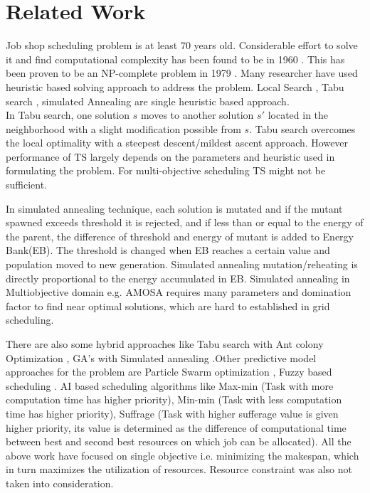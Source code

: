 \chapter{Related Work}
Job shop scheduling problem is at least 70 years old. Considerable effort to solve it and find computational complexity has been found to be in 1960 \cite{manne1960job}. This has been proven to be an NP-complete problem in 1979 \cite{jis1979computers}. Many researcher have used heuristic based solving approach to address the problem. Local Search \cite{ritchie2003fast}, Tabu search \cite{abraham2000nature}, simulated Annealing \cite{yarkhan2002experiments} \cite{abraham2000nature} are single heuristic based approach. \\
In Tabu search, one solution $s$ moves to another solution $s'$ located in the neighborhood with a slight modification possible from $s$. Tabu search overcomes the local optimality with a steepest descent/mildest ascent approach. However performance of TS largely depends on the parameters and heuristic used in formulating the problem. For multi-objective scheduling TS might not be sufficient. 

In simulated annealing technique, each solution is mutated and if the mutant spawned exceeds threshold it is rejected, and if less than or equal to the energy of the parent, the difference of threshold and energy of mutant is added to Energy Bank(EB). The  threshold is changed when EB reaches a certain value and population moved to new generation. Simulated annealing mutation/reheating is directly proportional to the energy accumulated in EB. Simulated annealing in Multiobjective domain e.g. AMOSA \cite{bandyopadhyay2008simulated} requires many parameters and domination factor to find near optimal solutions, which are hard to established in grid scheduling.

There are also some hybrid approaches like Tabu search with Ant colony Optimization \cite{ritchie2003static} \cite{ritchie2004hybrid}, GA's with Simulated annealing \cite{zheng2006task}.Other predictive model approaches for the problem are Particle Swarm optimization \cite{liu2010scheduling}  \cite{abraham2006scheduling}, Fuzzy based scheduling \cite{kumar2004fuzzy}. AI based scheduling algorithms like Max-min (Task with more computation time has higher priority), Min-min (Task with less computation time has higher priority), Suffrage (Task with higher sufferage value is given higher priority, its value is determined as the difference of computational time between best and second best resources on which job can be allocated)\cite{ibarra1977heuristic}. All the above work have focused on single objective i.e. minimizing the makespan, which in turn maximizes the utilization of resources. Resource constraint was also not taken into consideration.

